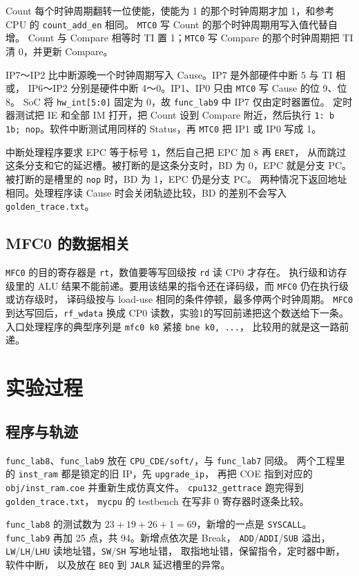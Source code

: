 \documentclass{article}
\begin{document}
Count 每个时钟周期翻转一位使能，使能为 1 的那个时钟周期才加 1，和参考 CPU 的 \texttt{count\_add\_en} 相同。
\texttt{MTC0} 写 Count 的那个时钟周期用写入值代替自增。
Count 与 Compare 相等时 TI 置 1；\texttt{MTC0} 写 Compare 的那个时钟周期把 TI 清 0，并更新 Compare。

IP7～IP2 比中断源晚一个时钟周期写入 Cause。IP7 是外部硬件中断 5 与 TI 相或，
IP6～IP2 分别是硬件中断 4～0。IP1、IP0 只由 \texttt{MTC0} 写 Cause 的位 9、位 8。
SoC 将 \texttt{hw\_int[5:0]} 固定为 0，故 \texttt{func\_lab9} 中 IP7 仅由定时器置位。
定时器测试把 IE 和全部 IM 打开，把 Count 设到 Compare 附近，然后执行
\texttt{1: b 1b; nop}。软件中断测试用同样的 Status，再 \texttt{MTC0} 把 IP1 或 IP0 写成 1。

中断处理程序要求 EPC 等于标号 \texttt{1}，然后自己把 EPC 加 8 再 \texttt{ERET}，
从而跳过这条分支和它的延迟槽。被打断的是这条分支时，BD 为 0，EPC 就是分支 PC。
被打断的是槽里的 \texttt{nop} 时，BD 为 1，EPC 仍是分支 PC。
两种情况下返回地址相同。处理程序读 Cause 时会关闭轨迹比较，BD 的差别不会写入 \texttt{golden\_trace.txt}。

\subsection{MFC0 的数据相关}
\texttt{MFC0} 的目的寄存器是 \texttt{rt}，数值要等写回级按 \texttt{rd} 读 CP0 才存在。
执行级和访存级里的 ALU 结果不能前递。要用该结果的指令还在译码级，而 \texttt{MFC0} 仍在执行级或访存级时，
译码级按与 load-use 相同的条件停顿，最多停两个时钟周期。
\texttt{MFC0} 到达写回后，\texttt{rf\_wdata} 换成 CP0 读数，实验1的写回前递把这个数送给下一条。
入口处理程序的典型序列是 \texttt{mfc0 k0} 紧接 \texttt{bne k0, ...}，
比较用的就是这一路前递。

\section{实验过程}
\subsection{程序与轨迹}
\texttt{func\_lab8}、\texttt{func\_lab9} 放在 \texttt{CPU\_CDE/soft/}，与 \texttt{func\_lab7} 同级。
两个工程里的 \texttt{inst\_ram} 都是锁定的旧 IP，先 \texttt{upgrade\_ip}，
再把 COE 指到对应的 \texttt{obj/inst\_ram.coe} 并重新生成仿真文件。
\texttt{cpu132\_gettrace} 跑完得到 \texttt{golden\_trace.txt}，
\texttt{mycpu} 的 testbench 在写非 0 寄存器时逐条比较。

\texttt{func\_lab8} 的测试数为 $23+19+26+1=69$，新增的一点是 \texttt{SYSCALL}。
\texttt{func\_lab9} 再加 25 点，共 94。新增点依次是 Break，
\texttt{ADD}/\texttt{ADDI}/\texttt{SUB} 溢出，
\texttt{LW}/\texttt{LH}/\texttt{LHU} 读地址错，\texttt{SW}/\texttt{SH} 写地址错，
取指地址错，保留指令，定时器中断，软件中断，
以及放在 \texttt{BEQ} 到 \texttt{JALR} 延迟槽里的异常。
\end{document}
